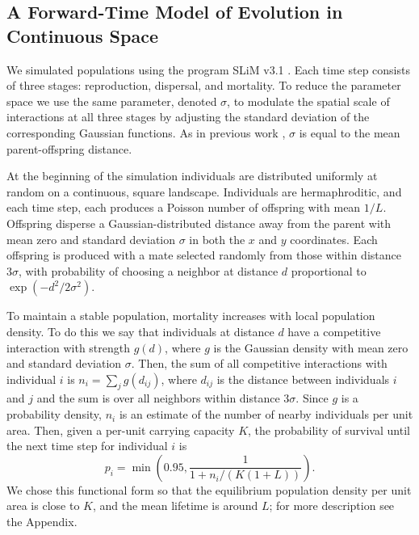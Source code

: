 \documentclass[10pt,twoside,lineno,hidelinks]{preprint}
\begin{document}
\subsection{A Forward-Time Model of Evolution in Continuous Space}

We simulated populations using the program SLiM v3.1 \citep{Haller2019}. 
Each time step consists of three stages: reproduction, dispersal, and mortality. 
To reduce the parameter space we use the same parameter, denoted $\sigma$, 
to modulate the spatial scale of interactions at all three stages by adjusting the standard deviation of the corresponding Gaussian functions. 
As in previous work \citep{Wright1943,Ringbauer2017}, $\sigma$ is equal to the mean parent-offspring distance.  

At the beginning of the simulation individuals are distributed uniformly at random on a continuous, square landscape. 
Individuals are hermaphroditic, and each time step, each produces a Poisson number of offspring with mean $1/L$.
Offspring disperse a Gaussian-distributed distance away from the parent with mean zero and standard deviation $\sigma$
in both the $x$ and $y$ coordinates. 
Each offspring is produced with a mate selected randomly from those within distance $3 \sigma$,
with probability of choosing a neighbor at distance $d$ proportional to $\exp(-d^2 / 2 \sigma^2)$.

To maintain a stable population, mortality increases with local population density.
To do this we say that individuals at distance $d$ have a competitive interaction with strength $g(d)$,
where $g$ is the Gaussian density with mean zero and standard deviation $\sigma$.
Then, the sum of all competitive interactions with individual $i$ is $n_i = \sum_j g(d_{ij})$,
where $d_{ij}$ is the distance between individuals $i$ and $j$ and the sum is over all neighbors within distance $3 \sigma$.
Since $g$ is a probability density, $n_i$ is an estimate of the number of nearby individuals per unit area.
Then, given a per-unit carrying capacity $K$, 
the probability of survival until the next time step for individual $i$ is
\begin{equation} \label{eqn:p_survival}
    p_i 
    =
    \min\left( 0.95, \frac{1}{1 + n_i / (K (1+L))} \right) .
\end{equation}
We chose this functional form so that the equilibrium population density per unit area is close to $K$, 
and the mean lifetime is around $L$;
for more description see the Appendix. %
\end{document}
